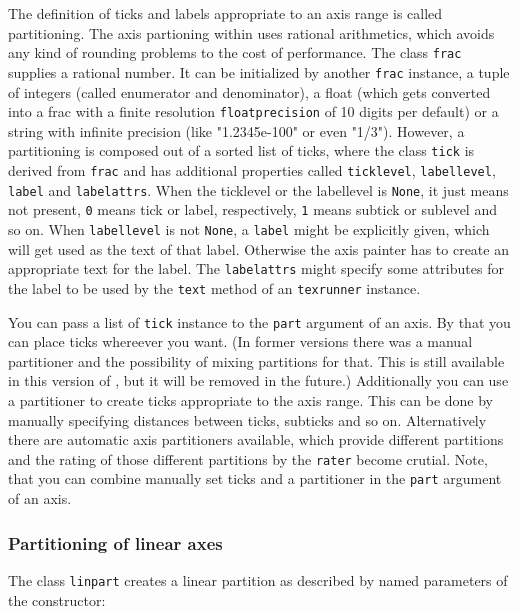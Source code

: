 The definition of ticks and labels appropriate to an axis range is
called partitioning. The axis partioning within \PyX{} uses rational
arithmetics, which avoids any kind of rounding problems to the cost of
performance. The class \verb|frac| supplies a rational number. It can
be initialized by another \verb|frac| instance, a tuple of integers
(called enumerator and denominator), a float (which gets converted
into a frac with a finite resolution \verb|floatprecision| of 10
digits per default) or a string with infinite precision (like
"1.2345e-100" or even "1/3"). However, a partitioning is composed out
of a sorted list of ticks, where the class \verb|tick| is derived from
\verb|frac| and has additional properties called \verb|ticklevel|,
\verb|labellevel|, \verb|label| and \verb|labelattrs|. When the
ticklevel or the labellevel is \verb|None|, it just means not present,
\verb|0| means tick or label, respectively, \verb|1| means subtick or
sublevel and so on. When \verb|labellevel| is not \verb|None|, a
\verb|label| might be explicitly given, which will get used as the
text of that label. Otherwise the axis painter has to create an
appropriate text for the label. The \verb|labelattrs| might specify
some attributes for the label to be used by the \verb|text| method of
an \verb|texrunner| instance.

You can pass a list of \verb|tick| instance to the \verb|part|
argument of an axis. By that you can place ticks whereever you want.
(In former versions there was a manual partitioner and the possibility
of mixing partitions for that. This is still available in this
version of \PyX{}, but it will be removed in the future.) Additionally
you can use a partitioner to create ticks appropriate to the axis
range. This can be done by manually specifying distances between
ticks, subticks and so on. Alternatively there are automatic axis
partitioners available, which provide different partitions and the
rating of those different partitions by the \verb|rater| become
crutial. Note, that you can combine manually set ticks and a
partitioner in the \verb|part| argument of an axis.

\subsubsection{Partitioning of linear axes}

The class \verb|linpart| creates a linear partition as described by
named parameters of the constructor:

